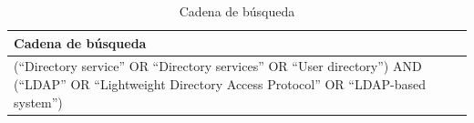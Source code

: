 \begin{table}[H]
	\centering
	\caption{Cadena de búsqueda}
	\label{tab:cadena-busqueda}

	\renewcommand{\arraystretch}{1.2}
	\fontsize{9pt}{10pt}\selectfont

	\begin{tabularx}{\textwidth}{|X|}
		\hline
		\tableheader
		\textbf{Cadena de búsqueda} \\
		\hline
		(``Directory service'' OR ``Directory services'' OR ``User directory'') AND (``LDAP'' OR ``Lightweight Directory Access Protocol'' OR ``LDAP-based system'')
		\\
		\hline
	\end{tabularx}
\end{table}

